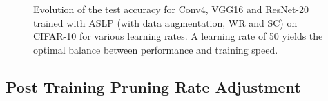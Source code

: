 \begin{figure}[htbp]
  \centering
  \caption{Evolution of the test accuracy for Conv4, VGG16 and ResNet-20 trained
    with \ac{ASLP} (with data augmentation, \ac{WR} and \ac{SC}) on CIFAR-10 for various learning
    rates. A learning rate of 50 yields the optimal balance between performance
    and training speed.}
  \label{fig:chap2:lr_impact}
\end{figure}

\subsection{Post Training Pruning Rate Adjustment}
\label{sec:chap2:increasing_sparsity}

